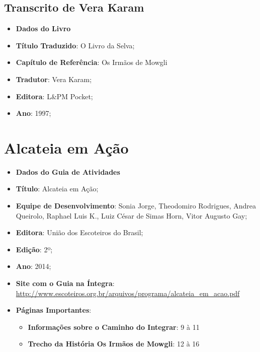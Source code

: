		\subsection[Transcrito de Vera Karam]{Transcrito de Vera Karam}
		\label{sec:referencias_livroDaSelva}
			\begin{itemize}
				\item[]{\textbf{Dados do Livro}}
				\item{\textbf{Título Traduzido}: O Livro da Selva;}
				\item{\textbf{Capítulo de Referência}: Os Irmãos de Mowgli}
				\item{\textbf{Tradutor}: Vera Karam;}
				\item{\textbf{Editora}: L\&PM Pocket;}
				\item{\textbf{Ano}: 1997;}
			\end{itemize}
			
	\section[Alcateia em Ação]{Alcateia em Ação}
	\label{sec:referencias_alcateiaEmAcao}
		\begin{itemize}
			\item[]{\textbf{Dados do Guia de Atividades}}
			\item{\textbf{Título}: Alcateia em Ação;}
			\item{\textbf{Equipe de Desenvolvimento}: Sonia Jorge, Theodomiro Rodrigues, Andrea Queirolo, Raphael Luis K., Luiz César de Simas Horn, Vitor Augusto Gay;}
			\item{\textbf{Editora}: União dos Escoteiros do Brasil;}
			\item{\textbf{Edição}: 2º;}
			\item{\textbf{Ano}: 2014;}
			\item{\textbf{Site com o Guia na Íntegra}: \url{http://www.escoteiros.org.br/arquivos/programa/alcateia_em_acao.pdf}}
			\item{\textbf{Páginas Importantes}:
				\begin{itemize}
					\item{\textbf{Informações sobre o Caminho do Integrar}: 9 à 11}
					\item{\textbf{Trecho da História Os Irmãos de Mowgli}: 12 à 16}
				\end{itemize}}
		\end{itemize}


